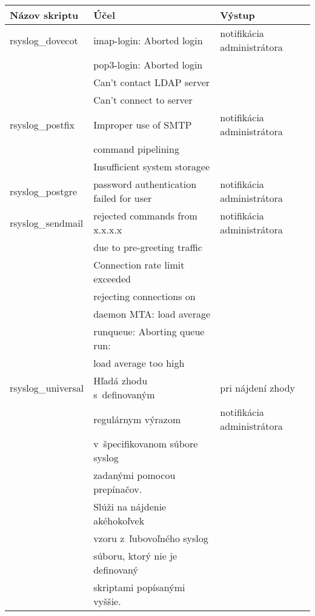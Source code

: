\noindent \begin{tabular}{ | l | l | l | }
	\hline
	Názov skriptu & Účel & Výstup \\ \hline
	{rsyslog\_dovecot} & imap-login: Aborted login & {notifikácia administrátora}\\ \cline{2-2}
	& pop3-login: Aborted login & \\ \cline{2-2}
	& Can't contact LDAP server &  \\ \cline{2-2}
	& Can't connect to server & \\ \hline
	
	{rsyslog\_postfix} & Improper use of SMTP  &  {notifikácia administrátora} \\
	& command pipelining &  \\ \cline{2-2}
	& Insufficient system storagee &  \\ \hline
	
	{rsyslog\_postgre} & password authentication failed for user  &  {notifikácia administrátora}  \\ \hline
	
	{rsyslog\_sendmail} & rejected commands from x.x.x.x  & {notifikácia administrátora}\\
	& due to pre-greeting traffic & \\ \cline{2-2}
	& Connection rate limit exceeded &  \\ \cline{2-2}
	& rejecting connections on  & \\ 
	& daemon MTA: load average & \\ \cline{2-2}
	& runqueue: Aborting queue run:  & \\ 
	& load average too high & \\ \hline
	 
	{rsyslog\_universal} & Hľadá zhodu s~definovaným    & {pri nájdení zhody}\\
	& regulárnym výrazom & {notifikácia administrátora}\\ 
	& v~špecifikovanom súbore syslog &  \\ 
	& zadanými pomocou prepínačov.  & \\ 
	& Slúži na nájdenie akéhokoľvek & \\
	& vzoru z~ľubovoľného syslog  & \\ 
	& súboru, ktorý nie je definovaný & \\
	& skriptami popísanými vyššie. & \\ \hline
	
\end{tabular}


